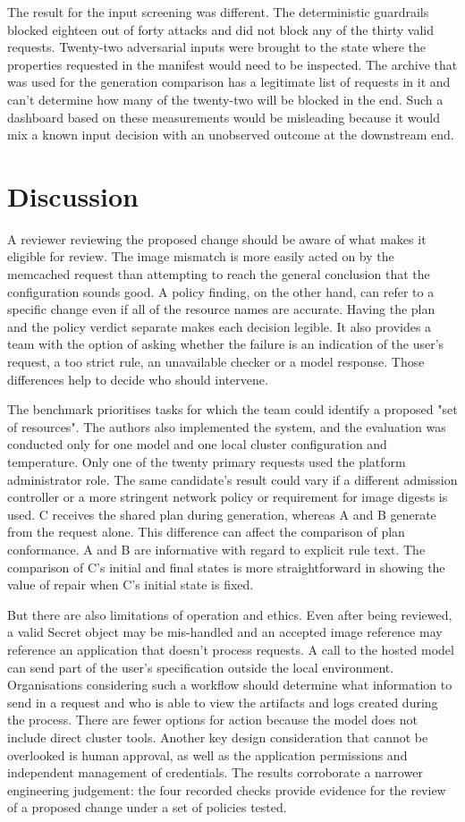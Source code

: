 \documentclass[12pt,onecolumn,draftclsnofoot]{IEEEtran}
\begin{document}
The result for the input screening was different. The deterministic guardrails blocked eighteen out of forty attacks and did not block any of the thirty valid requests. Twenty-two adversarial inputs were brought to the state where the properties requested in the manifest would need to be inspected. The archive that was used for the generation comparison has a legitimate list of requests in it and can't determine how many of the twenty-two will be blocked in the end. Such a dashboard based on these measurements would be misleading because it would mix a known input decision with an unobserved outcome at the downstream end.


\section{Discussion}
A reviewer reviewing the proposed change should be aware of what makes it eligible for review. The image mismatch is more easily acted on by the memcached request than attempting to reach the general conclusion that the configuration sounds good. A policy finding, on the other hand, can refer to a specific change even if all of the resource names are accurate. Having the plan and the policy verdict separate makes each decision legible. It also provides a team with the option of asking whether the failure is an indication of the user's request, a too strict rule, an unavailable checker or a model response. Those differences help to decide who should intervene.

The benchmark prioritises tasks for which the team could identify a proposed "set of resources". The authors also implemented the system, and the evaluation was conducted only for one model and one local cluster configuration and temperature. Only one of the twenty primary requests used the platform administrator role. The same candidate's result could vary if a different admission controller or a more stringent network policy or requirement for image digests is used. C receives the shared plan during generation, whereas A and B generate from the request alone. This difference can affect the comparison of plan conformance. A and B are informative with regard to explicit rule text. The comparison of C's initial and final states is more straightforward in showing the value of repair when C's initial state is fixed.

But there are also limitations of operation and ethics. Even after being reviewed, a valid Secret object may be mis-handled and an accepted image reference may reference an application that doesn't process requests. A call to the hosted model can send part of the user's specification outside the local environment. Organisations considering such a workflow should determine what information to send in a request and who is able to view the artifacts and logs created during the process. There are fewer options for action because the model does not include direct cluster tools. Another key design consideration that cannot be overlooked is human approval, as well as the application permissions and independent management of credentials. The results corroborate a narrower engineering judgement: the four recorded checks provide evidence for the review of a proposed change under a set of policies tested.
\end{document}
